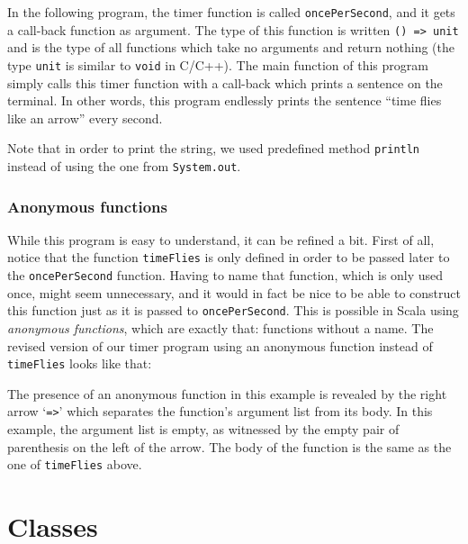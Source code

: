\documentclass[a4paper,11pt,twoside,titlepage]{article}
\begin{document}
In the following program, the timer function is called
\lstinline?oncePerSecond?, and it gets a call-back function as argument.
The type of this function is written \verb|() => unit| and is the type
of all functions which take no arguments and return nothing (the type
\lstinline?unit? is similar to \lstinline?void? in C/C++). The main function of
this program simply calls this timer function with a call-back which
prints a sentence on the terminal. In other words, this program
endlessly prints the sentence ``time flies like an arrow'' every
second.

Note that in order to print the string, we used predefined method
\lstinline?println? instead of using the one from \lstinline?System.out?.

\subsubsection*{Anonymous functions}
\label{sec:anonymous-functions}

While this program is easy to understand, it can be refined a bit.
First of all, notice that the function \lstinline?timeFlies? is only
defined in order to be passed later to the \lstinline?oncePerSecond?
function. Having to name that function, which is only used once, might
seem unnecessary, and it would in fact be nice to be able to construct
this function just as it is passed to \lstinline?oncePerSecond?. This is
possible in Scala using \emph{anonymous functions}, which are exactly
that: functions without a name. The revised version of our timer
program using an anonymous function instead of \lstinline?timeFlies? looks
like that:

The presence of an anonymous function in this example is revealed by
the right arrow `\verb|=>|' which separates the function's argument
list from its body. In this example, the argument list is empty, as
witnessed by the empty pair of parenthesis on the left of the arrow.
The body of the function is the same as the one of \lstinline?timeFlies?
above.


\section*{Classes}
\label{sec:classes}
\end{document}
